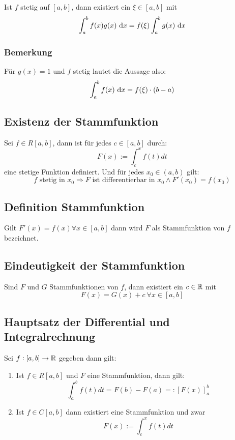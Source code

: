 Ist $f$ stetig auf $[a, b]$, dann existiert ein $\xi \in [a, b]$ mit
\begin{equation*}
    \int_a^b f(x)g(x)\text{ d}x = f(\xi) \int_a^b g(x) \text{ d}x
\end{equation*}

\subsubsection{Bemerkung}
Für $g(x)=1$ und $f$ stetig lautet die Aussage also:
\begin{equation*}
    \int_a^b f(x) \text{ d}x = f(\xi) \cdot (b - a)
\end{equation*}

\subsection{Existenz der Stammfunktion}
Sei $f \in R[a, b]$, dann ist für jedes $c \in [a, b]$ durch:
\begin{equation*}
    F(x) := \int_c^x f(t) dt
\end{equation*}
eine stetige Funktion definiert. Und für jedes $x_0 \in (a,b)$ gilt:
\begin{equation*}
    f \text{ stetig in } x_0 \Rightarrow F \text{ ist differentierbar in } x_0
    \land F'(x_0)=f(x_0)
\end{equation*}

\subsection{Definition Stammfunktion}
Gilt $F'(x) = f(x) \forall x \in [a,b]$ dann wird $F$ als Stammfunktion von
$f$ bezeichnet.

\subsection{Eindeutigkeit der Stammfunktion}
Sind $F$ und $G$ Stammfunktionen von $f$, dann existiert ein $c \in \mathbb{R}$ mit
\begin{equation*}
    F(x) = G(x) + c\ \forall x \in [a, b]
\end{equation*}

\subsection{Hauptsatz der Differential und Integralrechnung}
Sei $f: [a,b] \rightarrow \mathbb{R}$ gegeben dann gilt:
\begin{enumerate}[label= (\alph*)]
    \item Ist $f \in R[a,b]$ und $F$ eine Stammfunktion, dann gilt:
        \begin{equation*}
            \int_a^b f(t) dt = F(b) - F(a) =: {\left[ F(x) \right]}_a^b
        \end{equation*}
    \item Ist $f \in C[a, b]$ dann existiert eine Stammfunktion und zwar
        \begin{equation*}
            F(x) := \int_c^x f(t) dt
        \end{equation*}
\end{enumerate}
